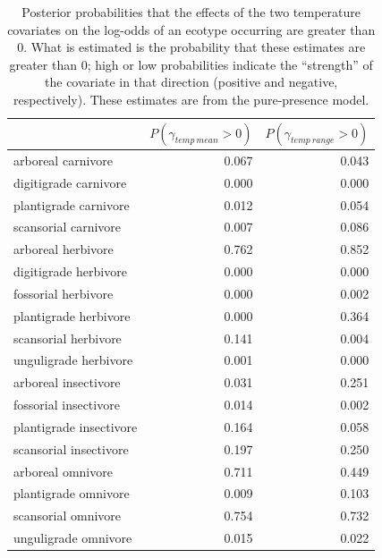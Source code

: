 \documentclass[12pt,letterpaper]{article}
\begin{document}
\begin{table}[ht]
  \centering
  \caption[Posterior probablity of effects of temperature on occurrence]{Posterior probabilities that the effects of the two temperature covariates on the log-odds of an ecotype occurring are greater than 0. What is estimated is the probability that these estimates are greater than 0; high or low probabilities indicate the ``strength'' of the covariate in that direction (positive and negative, respectively). These estimates are from the pure-presence model.}
  \label{tab:occur_temp}
  \begin{tabular}{ l r r }
    \hline
    & \(P(\gamma_{temp\ mean} > 0)\) & \(P(\gamma_{temp\ range} > 0)\) \\ 
    \hline
    arboreal carnivore & 0.067 & 0.043 \\ 
    digitigrade carnivore & 0.000 & 0.000 \\ 
    plantigrade carnivore & 0.012 & 0.054 \\ 
    scansorial carnivore & 0.007 & 0.086 \\ 
    arboreal herbivore & 0.762 & 0.852 \\ 
    digitigrade herbivore & 0.000 & 0.000 \\ 
    fossorial herbivore & 0.000 & 0.002 \\ 
    plantigrade herbivore & 0.000 & 0.364 \\ 
    scansorial herbivore & 0.141 & 0.004 \\ 
    unguligrade herbivore & 0.001 & 0.000 \\ 
    arboreal insectivore & 0.031 & 0.251 \\ 
    fossorial insectivore & 0.014 & 0.002 \\ 
    plantigrade insectivore & 0.164 & 0.058 \\ 
    scansorial insectivore & 0.197 & 0.250 \\ 
    arboreal omnivore & 0.711 & 0.449 \\ 
    plantigrade omnivore & 0.009 & 0.103 \\ 
    scansorial omnivore & 0.754 & 0.732 \\ 
    unguligrade omnivore & 0.015 & 0.022 \\ 
    \hline
  \end{tabular}
\end{table}
\end{document}

